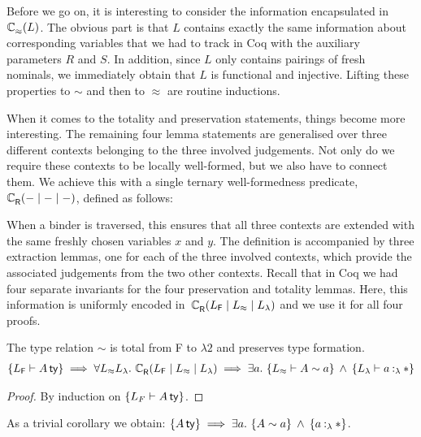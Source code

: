 \documentclass[a4paper,UKenglish]{lipics-v2016}
\newcommand{\ms}{\,}
\newcommand{\mrel}[1]{\mathrel{\ms #1 \ms}}
\newcommand{\mAnd}{\mrel{\wedge}}
\newcommand{\mAll}[1]{\ensuremath{\forall} #1.\ms\ms}
\newcommand{\mEx}[1]{\ensuremath{\exists} #1.\ms\ms}
\newcommand{\SysL}{$\lambda2$\xspace}
\newcommand{\istyFh}[1]{\ensuremath{#1\ms\mathsf{ty}}}
\newcommand{\typingFh}[2]{\ensuremath{#1 \mathbin{:_{\mathsf{F}}} #2}}
\newcommand{\typingLh}[2]{\ensuremath{#1 \mathbin{:_{\lambda}} #2}}
\newcommand{\tyr}{\mathrel{\sim}}
\newcommand{\tmr}{\mathrel{\approx}}
\newcommand{\Prp}{\ensuremath{\textrm{\textasteriskcentered}}}
\newcommand{\emptyctx}{\ensuremath{\bullet}}
\theoremstyle{plain}
\begin{document}
Before we go on, it is interesting to consider the information encapsulated in $\ac{\tmr}{~}{L}$.
The obvious part is that $L$ contains exactly the same information about corresponding variables that we had to track in Coq with the auxiliary parameters $R$ and $S$.
In addition, since $L$ only contains pairings of fresh nominals, we immediately obtain that $L$ is functional and injective.
Lifting these properties to $\tyr$ and then to $\tmr$ are routine inductions.

When it comes to the totality and preservation statements, things become more interesting.
The remaining four lemma statements are generalised over three different contexts belonging to the three involved judgements.
Not only do we require these contexts to be locally well-formed, but we also have to connect them.
We achieve this with a single ternary well-formedness predicate, $\mathbb{C}_{\mathsf{R}}^{~} (- \mid - \mid -)$, defined as follows:

\vspace{-.5em}
{\small
{}
}\vspace{-1em}

When a binder is traversed, this ensures that all three contexts are extended with the same freshly chosen variables $x$ and $y$.
The definition is accompanied by three extraction lemmas, one for each of the three involved contexts, which provide the associated judgements from the two other contexts.
Recall that in Coq we had four separate invariants for the four preservation and totality lemmas.
Here, this information is uniformly encoded in~$\acR{L_{\mathsf{F}}}{L_{\tmr}}{L_{\lambda}}$ and we use it for all four proofs.
\begin{lemma} The type relation $\tyr$ is total from F to \SysL and preserves type formation.
  \begin{align*}
    \aj{L_{\mathsf{F}}}{\istyFh{A}} \implies \mAll{L_{\tmr}L_{\lambda}} \acR{L_{\mathsf{F}}}{L_{\tmr}}{L_{\lambda}} \implies \mEx{a} \aj{L_{\tmr}}{A \tyr a} \mAnd \aj{L_{\lambda}}{\typingLh{a}{\Prp}}
\end{align*}
\end{lemma}
\begin{proof}
  By induction on $\aj{L_{F}}{\istyFh{A}}$.
\end{proof}
As a trivial corollary we obtain: $\aje{\istyFh{A}} \implies \mEx{a} \aje{A \tyr a} \mAnd \aje{\typingLh{a}{\Prp}}$.
\end{document}
